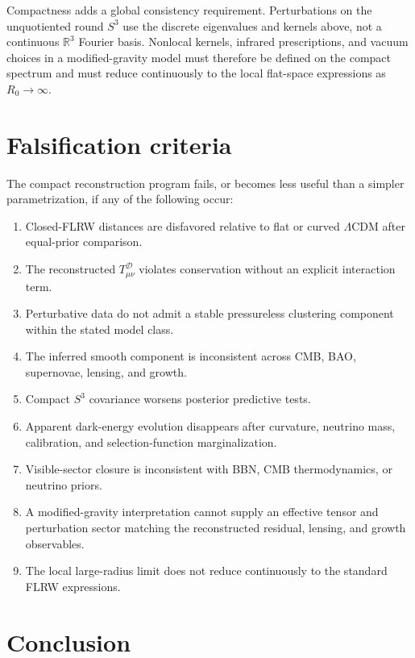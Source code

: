 \documentclass[
  aps,
  prd,
  reprint,
  superscriptaddress,
  nofootinbib,
  floatfix,
  longbibliography
]{revtex4-2}
\theoremstyle{plain}
\theoremstyle{definition}
\theoremstyle{remark}
\newcommand{\RR}{\mathbb R}
\newcommand{\D}{\mathcal D}
\newcommand{\LCDM}{\Lambda\mathrm{CDM}}
\begin{document}
Compactness adds a global consistency requirement.  Perturbations on the
unquotiented round $S^3$ use the discrete eigenvalues and kernels above, not a
continuous $\RR^3$ Fourier basis.  Nonlocal kernels, infrared prescriptions, and
vacuum choices in a modified-gravity model must therefore be defined on the
compact spectrum and must reduce continuously to the local flat-space
expressions as $R_0\to\infty$.

\section{Falsification criteria}

The compact reconstruction program fails, or becomes less useful than a simpler
parametrization, if any of the following occur:
\begin{enumerate}
\item Closed-FLRW distances are disfavored relative to flat or curved $\LCDM$
after equal-prior comparison.
\item The reconstructed $T^\D_{\mu\nu}$ violates conservation without an
explicit interaction term.
\item Perturbative data do not admit a stable pressureless clustering component
within the stated model class.
\item The inferred smooth component is inconsistent across CMB, BAO,
supernovae, lensing, and growth.
\item Compact $S^3$ covariance worsens posterior predictive tests.
\item Apparent dark-energy evolution disappears after curvature, neutrino mass,
calibration, and selection-function marginalization.
\item Visible-sector closure is inconsistent with BBN, CMB thermodynamics, or
neutrino priors.
\item A modified-gravity interpretation cannot supply an effective tensor and
perturbation sector matching the reconstructed residual, lensing, and growth
observables.
\item The local large-radius limit does not reduce continuously to the standard
FLRW expressions.
\end{enumerate}

\section{Conclusion}
\end{document}
